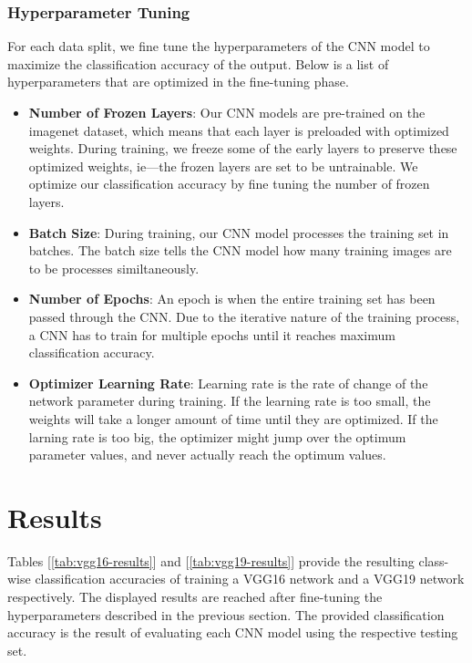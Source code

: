 \subsubsection{Hyperparameter Tuning}
For each data split, we fine tune the hyperparameters of the CNN model to maximize the classification accuracy of the output. Below is a list of hyperparameters that are optimized in the fine-tuning phase.

\begin{itemize}
  \item \textbf{Number of Frozen Layers}: Our CNN models are pre-trained on the imagenet dataset, which means that each layer is preloaded with optimized weights. During training, we freeze some of the early layers to preserve these optimized weights, ie—the frozen layers are set to be untrainable. We optimize our classification accuracy by fine tuning the number of frozen layers.
  \item \textbf{Batch Size}: During training, our CNN model processes the training set in batches. The batch size tells the CNN model how many training images are to be processes similtaneously.
  \item \textbf{Number of Epochs}: An epoch is when the entire training set has been passed through the CNN. Due to the iterative nature of the training process, a CNN has to train for multiple epochs until it reaches maximum classification accuracy.
  \item \textbf{Optimizer Learning Rate}: Learning rate is the rate of change of the network parameter during training. If the learning rate is too small, the weights will take a longer amount of time until they are optimized. If the larning rate is too big, the optimizer might jump over the optimum parameter values, and never actually reach the optimum values.
\end{itemize}

\section{Results}

Tables [\ref{tab:vgg16-results}] and [\ref{tab:vgg19-results}] provide the resulting class-wise classification accuracies of training a VGG16 network and a VGG19 network respectively. The displayed results are reached after fine-tuning the hyperparameters described in the previous section. The provided classification accuracy is the result of evaluating each CNN model using the respective testing set.


